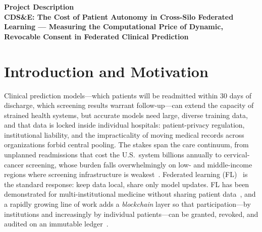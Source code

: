 \documentclass[11pt]{article}
\newcommand{\ptitle}{CDS\&E: The Cost of Patient Autonomy in Cross-Silo
Federated Learning --- Measuring the Computational Price of Dynamic,
Revocable Consent in Federated Clinical Prediction}
\begin{document}
\newpage

\begin{center}\textbf{Project Description}\\[2pt]\textbf{\ptitle}\end{center}

\section{Introduction and Motivation}
Clinical prediction models---which patients will be readmitted within 30 days of
discharge, which screening results warrant follow-up---can extend the capacity
of strained health systems, but accurate models
need large, diverse training data, and that data is locked inside individual
hospitals: patient-privacy regulation, institutional liability, and the
impracticality of moving medical records across organizations forbid central
pooling. The stakes span the care continuum, from unplanned readmissions that
cost the U.S.\ system billions annually to cervical-cancer screening, whose
burden falls overwhelmingly on low- and middle-income regions where screening
infrastructure is weakest~\cite{globocan}. Federated learning (FL)~\cite{fedavg,kairouz} is the standard response:
keep data local, share only model updates. FL has been demonstrated for
multi-institutional medicine without sharing patient data~\cite{sheller}, and a
rapidly growing line of work adds a \emph{blockchain} layer so that
participation---by institutions and increasingly by individual patients---can be
granted, revoked, and audited on an immutable ledger~\cite{mdpi2025,oxford2025}.
\end{document}
